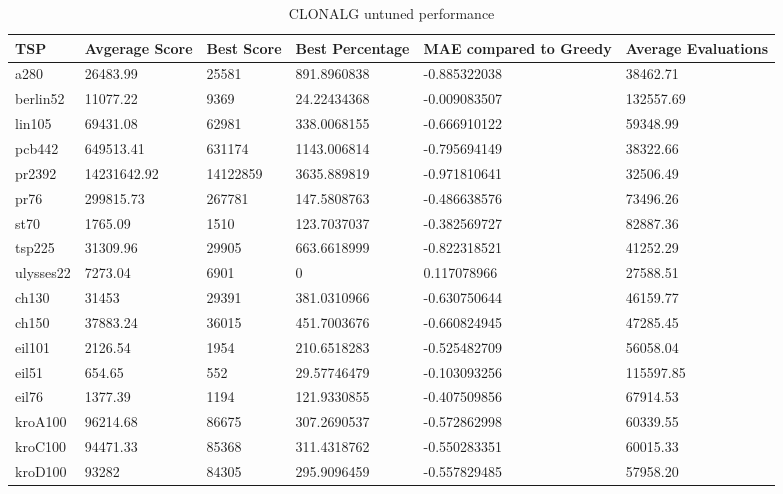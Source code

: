 \begin{table}[H]
	\begin{tabular}{|l|l|l|p{2cm}|p{2.5cm}|p{2cm}|}
		\hline
	TSP	& Avgerage Score & Best Score & Best Percentage & MAE compared to Greedy & Average Evaluations \\ \hline
		a280      & 26483.99       & 25581      & 891.8960838     & -0.885322038           & 38462.71            \\ \hline
		berlin52  & 11077.22       & 9369       & 24.22434368     & -0.009083507           & 132557.69           \\ \hline
		lin105    & 69431.08       & 62981      & 338.0068155     & -0.666910122           & 59348.99            \\ \hline
		pcb442    & 649513.41      & 631174     & 1143.006814     & -0.795694149           & 38322.66            \\ \hline
		pr2392    & 14231642.92    & 14122859   & 3635.889819     & -0.971810641           & 32506.49            \\ \hline
		pr76      & 299815.73      & 267781     & 147.5808763     & -0.486638576           & 73496.26            \\ \hline
		st70      & 1765.09        & 1510       & 123.7037037     & -0.382569727           & 82887.36            \\ \hline
		tsp225    & 31309.96       & 29905      & 663.6618999     & -0.822318521           & 41252.29            \\ \hline
		ulysses22 & 7273.04        & 6901       & 0               & 0.117078966            & 27588.51            \\ \hline
		ch130     & 31453          & 29391      & 381.0310966     & -0.630750644           & 46159.77            \\ \hline
		ch150     & 37883.24       & 36015      & 451.7003676     & -0.660824945           & 47285.45            \\ \hline
		eil101    & 2126.54        & 1954       & 210.6518283     & -0.525482709           & 56058.04            \\ \hline
		eil51     & 654.65         & 552        & 29.57746479     & -0.103093256           & 115597.85           \\ \hline
		eil76     & 1377.39        & 1194       & 121.9330855     & -0.407509856           & 67914.53            \\ \hline
		kroA100   & 96214.68       & 86675      & 307.2690537     & -0.572862998           & 60339.55            \\ \hline
		kroC100   & 94471.33       & 85368      & 311.4318762     & -0.550283351           & 60015.33            \\ \hline
		kroD100   & 93282          & 84305      & 295.9096459     & -0.557829485           & 57958.20            \\ \hline
	\end{tabular}
	\caption{CLONALG untuned performance}
	\label{tab:clonalg_untuned}
\end{table}

